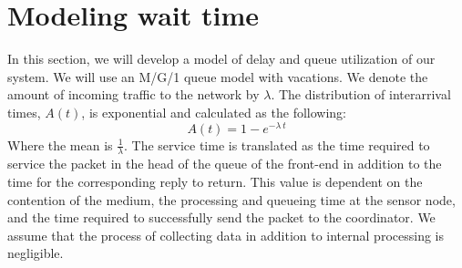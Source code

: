\section{Modeling wait time}\label{sec:model}

In this section, we will develop a model of delay and queue utilization of our system. We will use an M/G/1 queue model with vacations. We denote the amount of incoming traffic to the network by $\lambda$. The distribution of interarrival times, $A(t)$, is exponential and calculated as the following:
\begin{equation}
A(t) = 1 - e^{-\lambda\ t}
\end{equation}
Where the mean is $\frac{1}{\lambda}$. The service time is translated as the time required to service the packet in the head of the queue of the front-end in addition to the time for the corresponding reply to return. 
This value is dependent on the contention of the medium, the processing and queueing time at the sensor node, and the time required to successfully send the packet to the coordinator. We assume that the process of collecting data in addition to internal processing is negligible.

